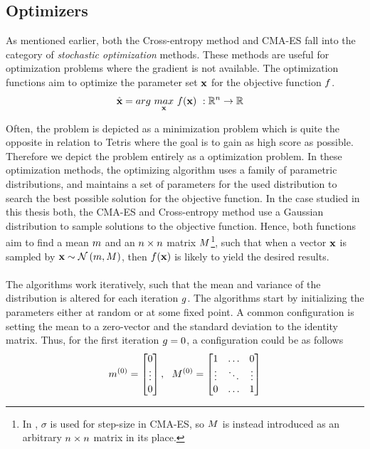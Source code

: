 \subsection{Optimizers \label{Optimizers}}

As mentioned earlier, both the Cross-entropy method and CMA-ES fall into the category of 
\textit{stochastic optimization}
methods. These methods are useful for 
optimization problems where the gradient is not available.
The optimization functions aim to optimize 
the parameter set $\textbf{x}$
for the objective function $f$.
\begin{align}
\hat{\textbf{\individual }} &= 
arg \  \underset{\textbf{\individual }}{max} \  
\fitnessFunction (\textbf{\individual }) \ 
:\mathbb{R}^{\dimensions } \rightarrow \mathbb{R}
\end{align}

Often, the problem is depicted as a minimization problem which is quite
the opposite in relation to Tetris where the goal is to gain as high score as possible.
Therefore we depict the problem entirely as a optimization problem.
In these optimization methods, the optimizing algorithm uses a family of parametric distributions,
and maintains a set of parameters for the used distribution
to search the best possible solution for the objective function.  
In the case studied in this thesis
both, the CMA-ES and Cross-entropy method use a 
Gaussian distribution to sample solutions to the objective function.
Hence, both functions aim to find a mean 
$m $ and an $n \times n$ matrix 
$M $\footnote{In \citep{hansen2011}, 
$\sigma$ is used for step-size in CMA-ES, so $M $ is instead introduced
as an arbitrary $n \times n$ matrix in its place.}, such that when
a vector $\textbf{x}$ is sampled by 
$\textbf{x} \sim \mathcal{N}\left( m, M \right)$, 
then $f (\textbf{x})$ 
is likely to yield the desired results.\\
\\
The algorithms work iteratively, such that the mean and variance 
of the distribution 
is altered for each iteration $g $.
The algorithms start by initializing the 
parameters either at random or at some fixed point. A common 
configuration is setting the mean to 
a zero-vector and the standard deviation to the identity matrix.
Thus, for the first iteration $g = 0$, a configuration could be as follows
\begin{align}
\mean^{(0)} =
\begin{bmatrix}
0\\
\vdots\\
0
\end{bmatrix},\ \ 
\varianceMatrix^{(0)} = 
\begin{bmatrix}
1 & \hdots & 0\\
\vdots & \ddots & \vdots\\
0 & \hdots & 1
\end{bmatrix}
\end{align}

